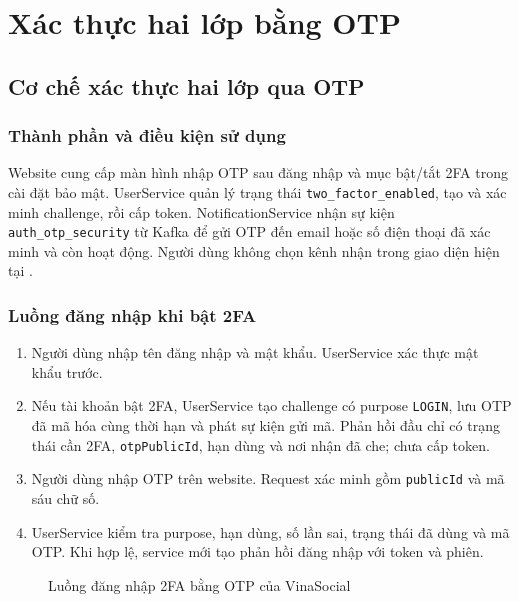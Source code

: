 \chapter{Xác thực hai lớp bằng OTP}\label{chap:twofa}
\section{Cơ chế xác thực hai lớp qua OTP}
\subsection{Thành phần và điều kiện sử dụng}
Website cung cấp màn hình nhập OTP sau đăng nhập và mục bật/tắt 2FA trong cài đặt bảo mật. UserService quản lý trạng thái \texttt{two\_factor\_enabled}, tạo và xác minh challenge, rồi cấp token. NotificationService nhận sự kiện \texttt{auth\_otp\_security} từ Kafka để gửi OTP đến email hoặc số điện thoại đã xác minh và còn hoạt động. Người dùng không chọn kênh nhận trong giao diện hiện tại \cite{twofa}.

\subsection{Luồng đăng nhập khi bật 2FA}
\begin{enumerate}
\item Người dùng nhập tên đăng nhập và mật khẩu. UserService xác thực mật khẩu trước.
\item Nếu tài khoản bật 2FA, UserService tạo challenge có purpose \texttt{LOGIN}, lưu OTP đã mã hóa cùng thời hạn và phát sự kiện gửi mã. Phản hồi đầu chỉ có trạng thái cần 2FA, \texttt{otpPublicId}, hạn dùng và nơi nhận đã che; chưa cấp token.
\item Người dùng nhập OTP trên website. Request xác minh gồm \texttt{publicId} và mã sáu chữ số.
\item UserService kiểm tra purpose, hạn dùng, số lần sai, trạng thái đã dùng và mã OTP. Khi hợp lệ, service mới tạo phản hồi đăng nhập với token và phiên.
\end{enumerate}

\begin{figure}[htbp]
\centering
{}
\caption{Luồng đăng nhập 2FA bằng OTP của VinaSocial}\label{fig:luong-2fa}
\end{figure}

